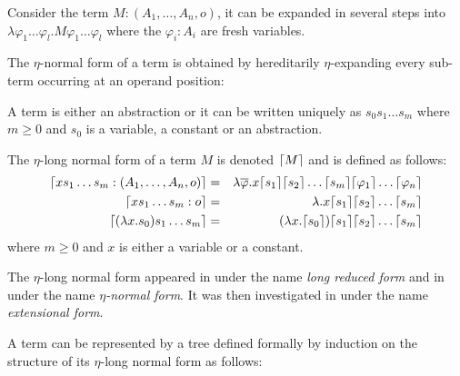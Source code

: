 Consider the term $M : (A_1,\ldots,A_n,o)$, it can be expanded in several steps into
$\lambda \varphi_1 \ldots \varphi_l . M \varphi_1 \ldots \varphi_l$
where the $\varphi_i:A_i$ are fresh variables.

The $\eta$-normal form of a term is obtained by hereditarily $\eta$-expanding every sub-term occurring
at an operand position:

\begin{dfn}
A term is either an abstraction or it can be written uniquely as
$s_0 s_1 \ldots s_m$ where $m\geq0$ and $s_0$ is a variable, a
constant or an abstraction.

The $\eta$-long normal form of a term $M$ is denoted $\lceil M\rceil$ and
is defined as follows:
\begin{eqnarray*}
\lceil x s_1 \ldots s_m : (A_1,\ldots,A_n,o)\rceil &=& \lambda \overline{\varphi} . x \lceil s_1\rceil \lceil s_2\rceil \ldots \lceil s_m\rceil \lceil \varphi_1\rceil \ldots \lceil \varphi_n\rceil \\
\lceil x s_1 \ldots s_m : o\rceil &=& \lambda . x \lceil s_1\rceil \lceil s_2\rceil \ldots \lceil s_m\rceil \\
\lceil (\lambda x . s_0) s_1 \ldots s_m \rceil &=& (\lambda x . \lceil s_0\rceil) \lceil s_1\rceil \lceil s_2\rceil \ldots \lceil s_m\rceil
\end{eqnarray*}
where $m \geq 0$ and $x$ is either a variable or a constant.
\end{dfn}

The $\eta$-long normal form appeared in \citep{DBLP:journals/tcs/JensenP76}
under the name \emph{long reduced form}
and in \citep{DBLP:journals/tcs/Huet75}
under the name \emph{$\eta$-normal form}. It was then investigated in \citep{huet76}
under the name \emph{extensional form}.


A term can be represented by a tree defined formally by induction on the structure
of its $\eta$-long normal form as follows:

